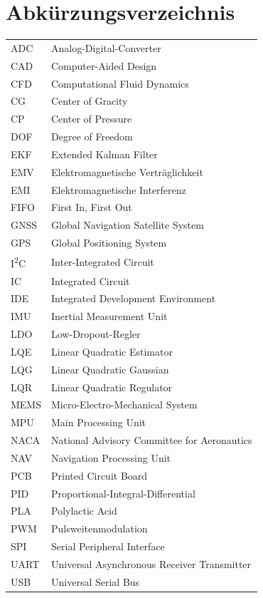 \chapter*{Abkürzungsverzeichnis}
\thispagestyle{fancy}
\pagestyle{fancy}
\begin{longtable}{p{3cm}p{10cm}}
ADC           & Analog-Digital-Converter \\
CAD           & Computer-Aided Design \\
CFD           & Computational Fluid Dynamics \\
CG            & Center of Gracity \\
CP            & Center of Pressure \\
DOF           & Degree of Freedom \\
EKF           & Extended Kalman Filter \\
EMV           & Elektromagnetische Verträglichkeit \\
EMI           & Elektromagnetische Interferenz \\
FIFO          & First In, First Out \\
GNSS          & Global Navigation Satellite System \\
GPS           & Global Positioning System \\
I\textsuperscript{2}C           & Inter-Integrated Circuit \\
IC            & Integrated Circuit \\
IDE           & Integrated Development Environment \\
IMU           & Inertial Measurement Unit \\
LDO           & Low-Dropout-Regler \\
LQE           & Linear Quadratic Estimator \\
LQG           & Linear Quadratic Gaussian \\
LQR           & Linear Quadratic Regulator \\
MEMS          & Micro-Electro-Mechanical System \\
MPU           & Main Processing Unit \\
NACA          & National Advisory Committee for Aeronautics \\
NAV           & Navigation Processing Unit \\
PCB           & Printed Circuit Board \\
PID           & Proportional-Integral-Differential \\
PLA           & Polylactic Acid \\
PWM           & Pulsweitenmodulation \\
SPI           & Serial Peripheral Interface \\
UART          & Universal Asynchronous Receiver Transmitter \\
USB           & Universal Serial Bus \\
\end{longtable}
\newpage
